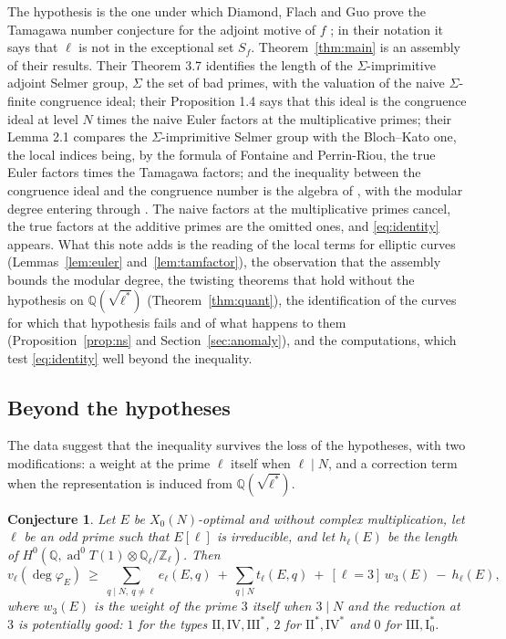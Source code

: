 \documentclass[11pt]{amsart}
\newtheorem{conjecture}[theorem]{Conjecture}
\theoremstyle{definition}
\newcommand{\Q}{\mathbb{Q}}
\newcommand{\Z}{\mathbb{Z}}
\newcommand{\degphi}{\deg\varphi_E}
\newcommand{\ad}{\operatorname{ad}^0}
\begin{document}
The hypothesis is the one under which Diamond, Flach and Guo prove the Tamagawa number conjecture for the adjoint motive of $f$ \cite[Theorem 0.1]{DFG04}; in their notation it says that $\ell$ is not in the exceptional set $S_f$. Theorem~\ref{thm:main} is an assembly of their results. Their Theorem 3.7 identifies the length of the $\Sigma$-imprimitive adjoint Selmer group, $\Sigma$ the set of bad primes, with the valuation of the naive $\Sigma$-finite congruence ideal; their Proposition 1.4 says that this ideal is the congruence ideal at level $N$ times the naive Euler factors at the multiplicative primes; their Lemma 2.1 compares the $\Sigma$-imprimitive Selmer group with the Bloch--Kato one, the local indices being, by the formula of Fontaine and Perrin-Riou, the true Euler factors times the Tamagawa factors; and the inequality between the congruence ideal and the congruence number is the algebra of \cite[Lemma 4.17]{DDT}, with the modular degree entering through \cite{ARS12}. The naive factors at the multiplicative primes cancel, the true factors at the additive primes are the omitted ones, and \eqref{eq:identity} appears. What this note adds is the reading of the local terms for elliptic curves (Lemmas~\ref{lem:euler} and~\ref{lem:tamfactor}), the observation that the assembly bounds the modular degree, the twisting theorems that hold without the hypothesis on $\Q(\sqrt{\ell^*})$ (Theorem~\ref{thm:quant}), the identification of the curves for which that hypothesis fails and of what happens to them (Proposition~\ref{prop:ns} and Section~\ref{sec:anomaly}), and the computations, which test \eqref{eq:identity} well beyond the inequality.

\subsection{Beyond the hypotheses}
The data suggest that the inequality survives the loss of the hypotheses, with two modifications: a weight at the prime $\ell$ itself when $\ell\mid N$, and a correction term when the representation is induced from $\Q(\sqrt{\ell^*})$.

\begin{conjecture}\label{conj:euler}
Let $E$ be $X_0(N)$-optimal and without complex multiplication, let $\ell$ be an odd prime such that $E[\ell]$ is irreducible, and let $h_\ell(E)$ be the length of $H^0(\Q,\ad T(1)\otimes\Q_\ell/\Z_\ell)$. Then
\begin{equation}\label{eq:rule}
v_\ell(\degphi)\ \ge\ \sum_{q\mid N,\ q\ne\ell}e_\ell(E,q)\ +\ \sum_{q\mid N}t_\ell(E,q)\ +\ [\ell=3]\,w_3(E)\ -\ h_\ell(E),
\end{equation}
where $w_3(E)$ is the weight of the prime $3$ itself when $3\mid N$ and the reduction at $3$ is potentially good: $1$ for the types $\mathrm{II},\mathrm{IV},\mathrm{III}^*$, $2$ for $\mathrm{II}^*,\mathrm{IV}^*$ and $0$ for $\mathrm{III},\mathrm{I}_0^*$.
\end{conjecture}
\end{document}
